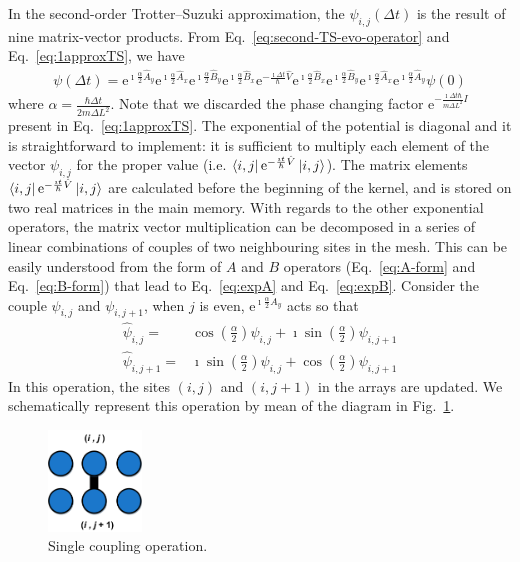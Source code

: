 In the second-order Trotter--Suzuki approximation, the $\psi_{i,j}(\Delta t)$ is the result of nine matrix-vector products. From Eq.~\eqref{eq:second-TS-evo-operator} and Eq.~\eqref{eq:1approxTS}, we have
\begin{align} \label{eq:single-iteration}
\psi(\Delta t) = \mathrm{e}^{\imath \frac{\alpha}{2} \hat{A}_y} \mathrm{e}^{\imath \frac{\alpha}{2} \hat{A}_x}   \mathrm{e}^{\imath \frac{\alpha}{2} \hat{B}_y} \mathrm{e}^{\imath \frac{\alpha}{2} \hat{B}_x}  \mathrm{e}^{-\frac{\imath \Delta t}{\hbar}\hat{V}} \mathrm{e}^{\imath \frac{\alpha}{2} \hat{B}_x} \mathrm{e}^{\imath \frac{\alpha}{2} \hat{B}_y} \mathrm{e}^{\imath \frac{\alpha}{2} \hat{A}_x} \mathrm{e}^{\imath \frac{\alpha}{2} \hat{A}_y} \psi(0)
\end{align}
where $\alpha = \frac{\hbar \Delta t}{2m\Delta L^2}$. Note that we discarded the phase changing factor $\mathrm{e}^{-\frac{\imath \Delta t \hbar}{m \Delta L^2} I}$ present in Eq.~\eqref{eq:1approxTS}. The exponential of the potential is diagonal and it is straightforward to implement: it is sufficient to multiply each element of the vector $\psi_{i,j}$ for the proper value (i.e. $\bra{i,j} \mathrm{e}^{-\frac{\imath t}{\hbar} \hat{V}} \ket{i,j}$). The matrix elements $\bra{i,j} \mathrm{e}^{-\frac{\imath t}{\hbar} \hat{V}} \ket{i,j}$ are calculated before the beginning of the kernel, and is stored on two real matrices in the main memory. With regards to the other exponential operators, the matrix vector multiplication can be decomposed in a series of linear combinations of couples of two neighbouring sites in the mesh. This can be easily understood from the form of $A$ and $B$ operators (Eq.~\eqref{eq:A-form} and Eq.~\eqref{eq:B-form}) that lead to Eq.~\eqref{eq:expA} and Eq.~\eqref{eq:expB}. Consider the couple $\psi_{i,j}$ and $\psi_{i,j+1}$, when $j$ is even, $\mathrm{e}^{\imath \frac{\alpha}{2} A_y}$ acts so that
\begin{align} \label{eq:single-coupling-operation}
\hat{\psi}_{i,j} = & \cos\left(\frac{\alpha}{2}\right) \psi_{i,j} + \imath \sin\left(\frac{\alpha}{2}\right) \psi_{i,j+1} \nonumber \\ 
\hat{\psi}_{i,j+1} = & \imath\sin\left(\frac{\alpha}{2}\right) \psi_{i,j} + \cos\left(\frac{\alpha}{2}\right) \psi_{i,j+1} 
\end{align}
In this operation, the sites $(i,j)$ and $(i,j+1)$ in the arrays are updated. We schematically represent this operation by mean of the diagram in Fig.~\ref{fig:scheme-single-iteration}.
\begin{figure}
   \centering
   \includegraphics[width=2.5cm]{Figs/Single_couple.png}
   \caption{Single coupling operation.} \label{fig:scheme-single-iteration}
\end{figure}
